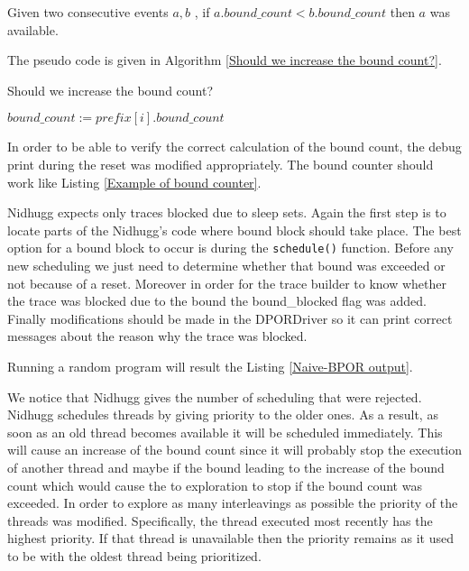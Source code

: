 Given two consecutive events $a,b$ , if $a.bound\_count < b.bound\_count$ then $a$ was available.

The pseudo code is given in Algorithm \ref{Should we increase the bound count?}.

\begin{algorithm}
    \caption{Should we increase the bound count?}
    \label{Should we increase the bound count?}
    $bound\_count := prefix[i].bound\_count$  \;

\end{algorithm}


In order to be able to verify the correct calculation of the bound count, the debug print during the reset was modified appropriately.
The bound counter should work like Listing \ref{Example of bound counter}.


Nidhugg expects only traces blocked due to sleep sets. Again the first step is to locate parts of the Nidhugg's code
where bound block should take place. The best option for a bound block to occur is during the \verb|schedule()|
function. Before any new scheduling we just need to determine whether that bound was exceeded or not because of a reset.
Moreover in order for the trace builder to know whether the trace was blocked due to the bound the bound\_blocked flag
was added. Finally modifications should be made in the DPORDriver so it can print correct messages about the reason why
the trace was blocked.

Running a random program will result the Listing \ref{Naive-BPOR output}.


We notice that Nidhugg gives the number of scheduling that were rejected. Nidhugg schedules threads by giving priority
to the older ones. As a result, as soon as an old thread becomes available it will be scheduled immediately. This will
cause an increase of the bound count since it will probably stop the execution of another thread and maybe if the bound
leading to the increase of the bound count which would cause the to exploration to stop if the bound count was exceeded.
In order to explore as many interleavings as possible the priority of the threads was modified. Specifically, the thread
executed most recently has the highest priority. If that thread is unavailable then the priority remains as it used to
be with the oldest thread being prioritized.

